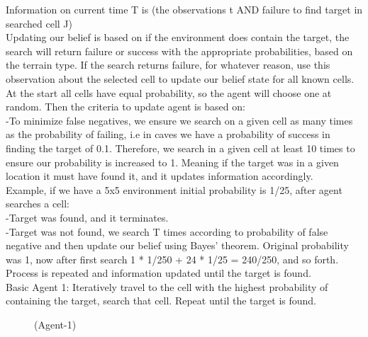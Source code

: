 \documentclass{article}
\theoremstyle{definition}
\begin{document}
\noindent Information on current time T is (the observations t AND failure to find target in searched cell J)\\
Updating our belief is based on if the environment does contain the target, the search will return failure or success with the appropriate probabilities, based on the terrain type.  If the search returns failure, for whatever reason, use this observation about the selected cell to update our belief state for all known cells. At the start all cells have equal probability, so the agent will choose one at random. Then the criteria to update agent is based on:\\
\indent\indent -To minimize false negatives, we ensure we search on a given cell as many times as the probability of failing, i.e in caves we have a probability of success in finding the target of 0.1. Therefore, we search in a given cell at least 10 times to ensure our probability is increased to 1. Meaning if the target was in a given location it must have found it, and it updates information accordingly. \\
Example, if we have a 5x5 environment initial probability is 1/25, after agent searches a cell:\\
\indent\indent -Target was found, and it terminates.\\
\indent\indent -Target was not found, we search T times according to probability of false negative and then update our belief using Bayes’ theorem. 
Original probability was 1, now after first search 1 * 1/250 + 24 * 1/25 = 240/250, and so forth. \\
Process is repeated and information updated until the target is found. \\
Basic Agent 1:  Iteratively travel to the cell with the highest probability of containing the target, search that cell.  Repeat until the target is found.\\
\begin{figure}[h!]	
		\caption{ (Agent-1)} 
\end{figure}\\	
\end{document}
